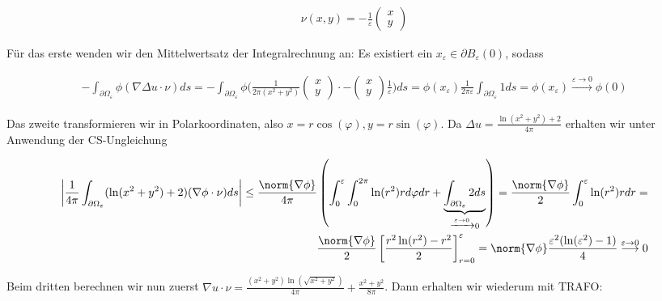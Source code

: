 \begin{solution}
\begin{align*}
  \nu(x,y)
  =
  -\frac{1}{\varepsilon}
  \left(\begin{array}{c}
    x \\
    y
  \end{array}\right)
\end{align*}

Für das erste wenden wir den Mittelwertsatz der Integralrechnung an: Es existiert
ein $x_\varepsilon \in \partial B_\varepsilon(0)$, sodass

\begin{align*}
  -\int_{\partial \Omega_\varepsilon} \phi (\nabla \Delta u \cdot \nu) ds
  =
  -\int_{\partial \Omega_\varepsilon} \phi
  \Big(\frac{1}{2\pi (x^2+y^2)}
  \begin{pmatrix} x \\ y \end{pmatrix} \cdot
  - \begin{pmatrix} x \\ y \end{pmatrix}
  \frac{1}{\varepsilon}\Big) ds
  =
  \phi(x_\varepsilon) \frac{1}{2\pi \varepsilon} \int_{\partial \Omega_\varepsilon} 1 ds
  =
  \phi(x_\varepsilon)
  \stackrel{\varepsilon \rightarrow 0}{\longrightarrow}
  \phi(0)
\end{align*}

Das zweite transformieren wir in Polarkoordinaten, also $x = r\cos(\varphi), y = r\sin(\varphi)$.
Da $\Delta u = \frac{\ln(x^2 +y^2) + 2}{4 \pi}$ erhalten wir unter Anwendung der CS-Ungleichung

\begin{align*}
  \left|\frac{1}{4\pi} \int_{\partial \Omega_\varepsilon} (\ln(x^2 + y^2) + 2) (\nabla \phi \cdot \nu) ds\right|
  \leq
  \frac{\norm{\nabla \phi}}{4 \pi} \left(\int_0^\varepsilon \int_0^{2 \pi} \ln(r^2) r d\varphi dr + \underbrace{\int_{\partial \Omega_\varepsilon} 2 ds}_{\xrightarrow{\varepsilon \rightarrow 0}0}\right)
  =
  \frac{\norm{\nabla \phi}}{2} \int_0^\varepsilon \ln(r^2) r dr
  = \\
  \frac{\norm{\nabla \phi}}{2} \left[\frac{r^2\ln(r^2) - r^2}{2}\right]_{r = 0}^\varepsilon
  =
  \norm{\nabla \phi}\frac{\varepsilon^2(\ln(\varepsilon^2)-1)}{4}
  \stackrel{\varepsilon \rightarrow 0}{\longrightarrow}
  0
\end{align*}

Beim dritten berechnen wir nun zuerst $\nabla u \cdot \nu = \frac{(x^2+y^2)\ln(\sqrt{x^2+y^2})}{4\pi}+\frac{x^2+y^2}{8\pi}$.
Dann erhalten wir wiederum mit TRAFO:


\end{solution}
